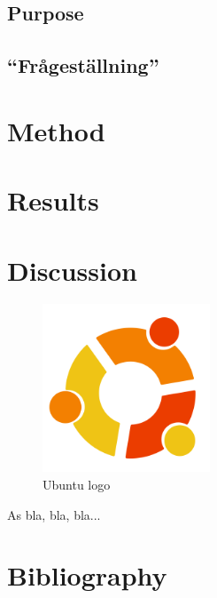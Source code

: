 \documentclass[11pt]{article}
\begin{document}
\subsection{Purpose}

\subsection{``Frågeställning''}

\section{Method}

\section{Results}

\section{Discussion}

\begin{figure}[h]
  \centering
  \includegraphics[width=5cm]{graphics/ubuntu.png}
  \caption{Ubuntu logo}
\end{figure}

As \cite{FeatureSelection2020} bla, bla, bla...\\

\section{Bibliography}

\printbibliography
\end{document}
